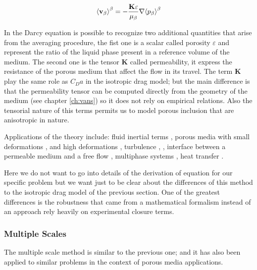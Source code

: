 \begin{equation}
{\left< \textbf{v}_{\beta} \right>}^{\beta} = -\dfrac{\mathbf{K} \varepsilon}{\mu_{\beta}} \nabla {\left< p_{\beta} \right>}^{\beta}
\label{eq:darcyeq}
\end{equation} 

In the Darcy equation is possible to recognize two additional quantities that arise from the averaging procedure, the fist one is a scalar called porosity $\varepsilon$ and represent the ratio of the liquid phase present in a reference volume of the medium.
The second one is the tensor $\mathbf{K}$ called permeability, it express the resistance of the porous medium that affect the flow in its travel.
The term $\mathbf{K}$ play the same role as $C_D a$ in the isotropic drag model; but the main difference is that the permeability tensor can be computed directly from the geometry of the medium (see chapter \ref{ch:vans}) so it does not rely on empirical relations.
Also the tensorial nature of this terms permits us to model porous inclusion that are anisotropic in nature.

Applications of the theory include: fluid inertial terms \citet{whitaker1996forchheimer}, porous media with small deformations \citet{whitaker1986flow2}, and high deformations \citet{hussong2011continuum}, turbulence \citet{soulaine2014}, \citet{breugem2006influence}, interface between a permeable medium and a free flow \citet{beavers1967boundary}, multiphase systems \citet{whitaker1973transport}, heat transfer \citet{carbonell1984heat}.

Here we do not want to go into details of the derivation of equation for our specific problem but we want just to be clear about the differences of this method to the isotropic drag model of the previous section.
One of the greatest differences is the robustness that came from a mathematical formalism instead of an approach rely heavily on experimental closure terms.

\subsubsection{Multiple Scales}

The multiple scale method is similar to the previous one; and it has also been applied to similar problems in the context of porous media applications.

